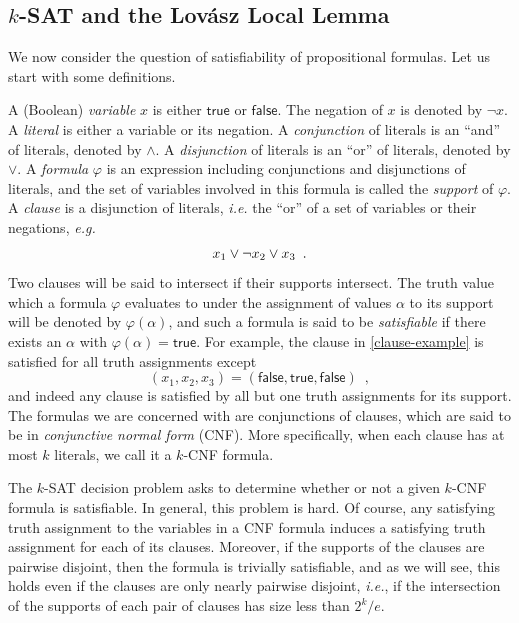 \documentclass{patmorin}
\begin{document}
\subsection{$k$-SAT and the Lov\'{a}sz Local Lemma}

We now consider the question of satisfiability of propositional
formulas. Let us start with some definitions.

A (Boolean) \emph{variable} $x$ is either $\textsf{true}$ or
$\textsf{false}$. The negation of $x$ is denoted by $\neg x$. A
\emph{literal} is either a variable or its negation. A
\emph{conjunction} of literals is an ``and'' of literals, denoted by
$\land$. A \emph{disjunction} of literals is an ``or'' of literals,
denoted by $\lor$. A \emph{formula} $\varphi$ is an expression
including conjunctions and disjunctions of literals, and the set of
variables involved in this formula is called the \emph{support} of
$\varphi$. A \emph{clause} is a disjunction of literals, \emph{i.e.}
the ``or'' of a set of variables or their negations, \emph{e.g.}
\begin{align}
  x_1 \lor \neg x_2 \lor x_3 \enspace . \eqlabel{clause-example}
\end{align}
Two clauses will be said to intersect if their supports intersect. The
truth value which a formula $\varphi$ evaluates to under the
assignment of values $\alpha$ to its support will be denoted by
$\varphi(\alpha)$, and such a formula is said to be \emph{satisfiable}
if there exists an $\alpha$ with $\varphi(\alpha) = \textsf{true}$.
For example, the clause in \eqref{clause-example} is satisfied for all
truth assignments except
\[
  (x_1, x_2, x_3) = (\textsf{false}, \textsf{true}, \textsf{false})
  \enspace ,
\]
and indeed any clause is satisfied by all but one truth assignments
for its support. The formulas we are concerned with are conjunctions
of clauses, which are said to be in \emph{conjunctive normal form}
(CNF). More specifically, when each clause has at most $k$
literals, we call it a $k$-CNF formula.

The $k$-SAT decision problem asks to determine whether or not a given
$k$-CNF formula is satisfiable. In general, this problem is hard. Of
course, any satisfying truth assignment to the variables in a CNF
formula induces a satisfying truth assignment for each of its
clauses. Moreover, if the supports of the clauses are pairwise
disjoint, then the formula is trivially satisfiable,
and as we will see, this holds even if the 
clauses are only nearly pairwise disjoint, \emph{i.e.},  if the
intersection of the supports of each pair of clauses
has size less than $2^k/e$.
\end{document}
